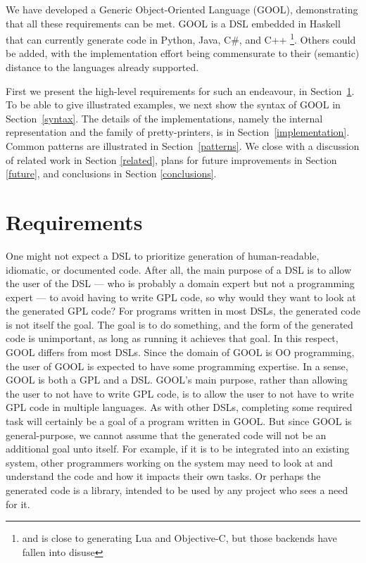 \documentclass[sigplan,review,anonymous]{acmart}
\begin{document}
We have developed a Generic Object-Oriented Language (GOOL), demonstrating
that all these requirements can be met.  GOOL is a DSL embedded in Haskell that
can currently generate code in Python, Java, C\#, and C++%
\footnote{and is close to generating Lua and Objective-C, but those backends
have fallen into disuse}. Others could be added, with the implementation
effort being commensurate to their (semantic) distance to the languages
already supported.

First we present the high-level requirements for such an endeavour, in
Section~\ref{sec:req}.  To be able to give illustrated examples, we
next show the syntax of GOOL in Section~\ref{syntax}. The details of
the implementations, namely the internal representation and the
family of pretty-printers, is in Section~\ref{implementation}.
Common patterns are illustrated in Section~\ref{patterns}.  We 
close with a discussion of related work in Section \ref{related}, plans for 
future improvements in Section \ref{future}, and conclusions in Section 
\ref{conclusions}.

\section{Requirements} \label{sec:req}

One might not expect a DSL to prioritize generation of human-readable, 
idiomatic, or documented code. After all, the main purpose of a DSL is to allow 
the user of the DSL --- who is probably a domain expert but not a programming 
expert --- to avoid having to write GPL code, so why would they want to look at 
the generated GPL code? For programs written in most DSLs, the generated code 
is not itself the goal. The goal is to do something, and the form of the 
generated code is unimportant, as long as running it achieves that goal. In 
this respect, GOOL differs from most DSLs. Since the domain of GOOL is OO 
programming, the user of GOOL is expected to have some programming expertise. 
In a sense, GOOL is both a GPL and a DSL. GOOL's main purpose, rather than 
allowing the user to not have to write GPL code, is to allow the user to not 
have to write GPL code in multiple languages. As with other DSLs, completing 
some required task will certainly be a goal of a program written in GOOL. But 
since GOOL is general-purpose, we cannot assume that the generated code will 
not be an additional goal unto itself. For example, if it is to be integrated 
into an existing system, other programmers working on the system may need to 
look at and understand the code and how it impacts their own tasks. Or perhaps 
the generated code is a library, intended to be used by any project who sees a 
need for it.
\end{document}
